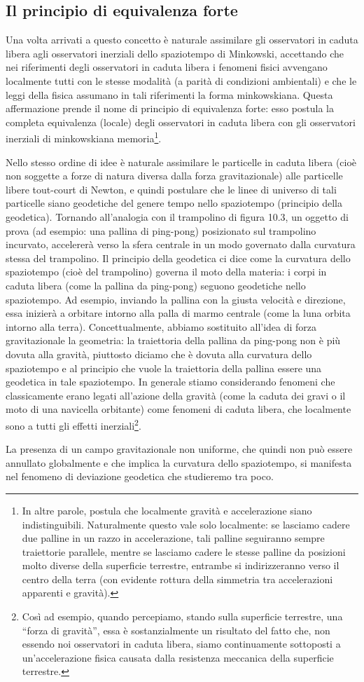 \subsection{Il principio di equivalenza forte}
Una volta arrivati a questo concetto è naturale assimilare gli osservatori in
caduta libera agli osservatori inerziali dello spaziotempo di Minkowski, accettando 
che nei riferimenti degli osservatori in caduta libera i fenomeni fisici
avvengano localmente tutti con le stesse modalità (a parità di condizioni
ambientali) e che le leggi della fisica assumano in tali riferimenti la forma
minkowskiana. Questa affermazione prende il nome di principio di equivalenza forte: 
esso postula la completa equivalenza (locale) degli osservatori
in caduta libera con gli osservatori inerziali di minkowskiana memoria\footnote{
In altre parole, postula che localmente gravità e accelerazione siano indistinguibili.
Naturalmente questo vale solo localmente: se lasciamo cadere due palline in un razzo in accelerazione,
tali palline seguiranno sempre traiettorie parallele, mentre se lasciamo cadere
le stesse palline da posizioni molto diverse della superficie terrestre, entrambe si indirizzeranno 
verso il centro della terra (con evidente rottura della simmetria tra accelerazioni
apparenti e gravità).}.

Nello stesso ordine di idee è naturale assimilare le particelle in caduta
libera (cioè non soggette a forze di natura diversa dalla forza gravitazionale)
alle particelle libere tout-court di Newton, e quindi postulare che le linee di
universo di tali particelle siano geodetiche del genere tempo nello spaziotempo
(principio della geodetica). Tornando all'analogia con il trampolino di
figura 10.3, un oggetto di prova (ad esempio: una pallina di ping-pong)
posizionato sul trampolino incurvato, accelererà verso la sfera centrale in
un modo governato dalla curvatura stessa del trampolino. Il principio della
geodetica ci dice come la curvatura dello spaziotempo (cioè del trampolino)
governa il moto della materia: i corpi in caduta libera (come la pallina da
ping-pong) seguono geodetiche nello spaziotempo. Ad esempio, inviando la
pallina con la giusta velocità e direzione, essa inizierà a orbitare intorno alla
palla di marmo centrale (come la luna orbita intorno alla terra).
Concettualmente, abbiamo sostituito all'idea di forza gravitazionale la
geometria: la traiettoria della pallina da ping-pong non è più dovuta alla
gravità, piuttosto diciamo che è dovuta alla curvatura dello spaziotempo e
al principio che vuole la traiettoria della pallina essere una geodetica in tale
spaziotempo. In generale stiamo considerando fenomeni che classicamente
erano legati all'azione della gravità (come la caduta dei gravi o il moto di
una navicella orbitante) come fenomeni di caduta libera, che localmente sono
a tutti gli effetti inerziali\footnote{
Così ad esempio, quando percepiamo, stando sulla superficie terrestre, una ``forza di
gravità'', essa è sostanzialmente un risultato del fatto che, non essendo noi osservatori
in caduta libera, siamo continuamente sottoposti a un'accelerazione fisica causata dalla
resistenza meccanica della superficie terrestre.}.

La presenza di un campo gravitazionale non uniforme, che quindi non può
essere annullato globalmente e che implica la curvatura dello spaziotempo, si
manifesta nel fenomeno di deviazione geodetica che studieremo tra poco.





